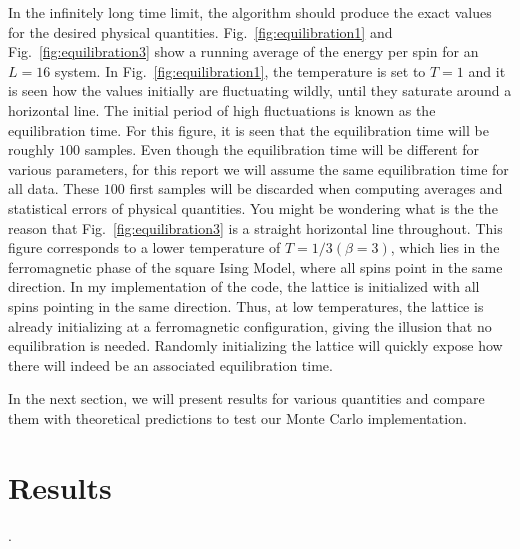 \documentclass[12pt]{article}
\newcommand{\figref}[1]{Fig.~\ref{#1}}
\begin{document}
In the infinitely long time limit, the algorithm should produce the exact values for the desired physical quantities. \figref{fig:equilibration1} and \figref{fig:equilibration3} show a running average of the energy per spin for an $L=16$ system. In \figref{fig:equilibration1}, the temperature is set to $T=1$ and it is seen how the values initially are fluctuating wildly, until they saturate around a horizontal line. The initial period of high fluctuations is known as the equilibration time. For this figure, it is seen that the equilibration time will be roughly $100$ samples. Even though the equilibration time will be different for various parameters, for this report we will assume the same equilibration time for all data. These $100$ first samples will be discarded when computing averages and statistical errors of physical quantities. You might be wondering what is the the reason that \figref{fig:equilibration3} is a straight horizontal line throughout. This figure corresponds to a lower temperature of $T=1/3 (\beta=3)$, which lies in the ferromagnetic phase of the square Ising Model, where all spins point in the same direction. In my implementation of the code, the lattice is initialized with all spins pointing in the same direction. Thus, at low temperatures, the lattice is already initializing at a ferromagnetic configuration, giving the illusion that no equilibration is needed. Randomly initializing the lattice will quickly expose how there will indeed be an associated equilibration time.

In the next section, we will present results for various quantities and compare them with theoretical predictions to test our Monte Carlo implementation.

\section{Results}. 
\end{document}
